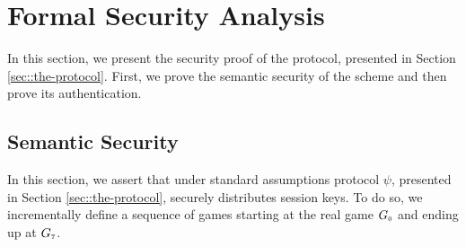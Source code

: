 
\section{Formal Security Analysis}\label{sec::Formal-Security-Analysis}

In this section, we present the security proof of the protocol, presented in Section \ref{sec::the-protocol}.  First, we prove the semantic security of the scheme and then prove its authentication. 

\subsection{Semantic Security}\label{sec::semSec-proof}




In this section, we assert that under standard assumptions protocol $\psi$, presented in Section \ref{sec::the-protocol}, securely distributes
session keys. To do so, we incrementally define a sequence of games starting at the real
game $G_{\scriptscriptstyle 0}$ and ending up at $G_{\scriptscriptstyle  7}$. 

